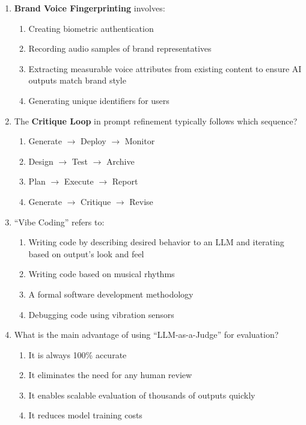 \documentclass[11pt]{article}
\begin{document}
\begin{enumerate}
\item \textbf{Brand Voice Fingerprinting} involves:
\begin{enumerate}[label=\Alph*)]
    \item Creating biometric authentication
    \item Recording audio samples of brand representatives
    \item Extracting measurable voice attributes from existing content to ensure AI outputs match brand style
    \item Generating unique identifiers for users
\end{enumerate}

\item The \textbf{Critique Loop} in prompt refinement typically follows which sequence?
\begin{enumerate}[label=\Alph*)]
    \item Generate $\to$ Deploy $\to$ Monitor
    \item Design $\to$ Test $\to$ Archive
    \item Plan $\to$ Execute $\to$ Report
    \item Generate $\to$ Critique $\to$ Revise
\end{enumerate}

\item ``Vibe Coding'' refers to:
\begin{enumerate}[label=\Alph*)]
    \item Writing code by describing desired behavior to an LLM and iterating based on output's look and feel
    \item Writing code based on musical rhythms
    \item A formal software development methodology
    \item Debugging code using vibration sensors
\end{enumerate}

\item What is the main advantage of using ``LLM-as-a-Judge'' for evaluation?
\begin{enumerate}[label=\Alph*)]
    \item It is always 100\% accurate
    \item It eliminates the need for any human review
    \item It enables scalable evaluation of thousands of outputs quickly
    \item It reduces model training costs
\end{enumerate}


\end{enumerate}
\end{document}
